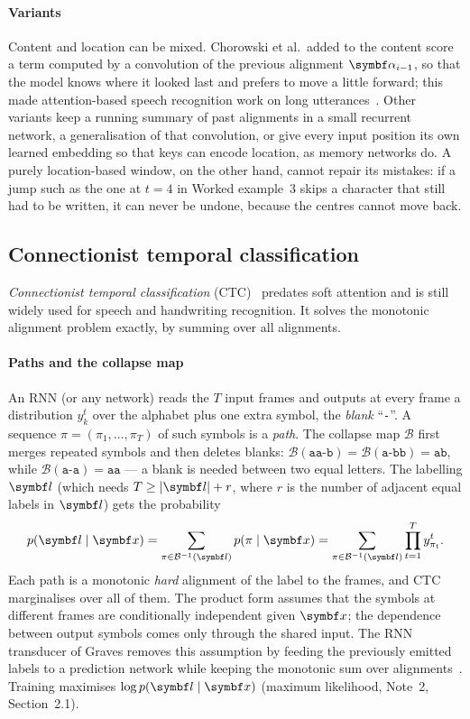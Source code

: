 \documentclass[11pt]{article}
\newcommand{\valpha}{\vect{\alpha}}
\newcommand{\blank}{\texttt{-}}
\begin{document}
\paragraph{Variants} Content and location can be mixed. Chorowski et al.\ added to the content score a term computed by a
convolution of the previous alignment $\valpha_{i-1}$, so that the model knows where it looked last and prefers to move a
little forward; this made attention-based speech recognition work on long utterances~\cite{chorowski2015}. Other
variants keep a running summary of past alignments in a small recurrent network, a generalisation of that convolution, or
give every input position its own learned embedding so that keys can encode location, as memory networks do. A purely
location-based window, on the other hand, cannot repair its mistakes: if a jump such as the one at $t = 4$ in Worked example~3 skips a
character that still had to be written, it can never be undone, because the centres cannot move back.

\subsection{Connectionist temporal classification}\label{sec:ctc}

\emph{Connectionist temporal classification} (CTC)~\cite{graves2006} predates soft attention and is still widely used for
speech and handwriting recognition. It solves the monotonic alignment problem exactly, by summing over all alignments.

\paragraph{Paths and the collapse map} An RNN (or any network) reads the $T$ input frames and outputs at every frame a
distribution $y^t_k$ over the alphabet plus one extra symbol, the \emph{blank} ``\blank''. A sequence $\pi = (\pi_1, \dots,
\pi_T)$ of such symbols is a \emph{path}. The collapse map $\mathcal{B}$ first merges repeated symbols and then deletes
blanks: $\mathcal{B}(\texttt{aa-b}) = \mathcal{B}(\texttt{a-bb}) = \texttt{ab}$, while $\mathcal{B}(\texttt{a-a}) =
\texttt{aa}$ --- a blank is needed between two equal letters. The labelling $\vect{l}$ (which needs $T \ge |\vect{l}| + r$,
where $r$ is the number of adjacent equal labels in $\vect{l}$) gets the probability
\begin{equation}\label{eq:ctc}
  p(\vect{l} \mid \x) = \sum_{\pi \in \mathcal{B}^{-1}(\vect{l})} p(\pi \mid \x)
  = \sum_{\pi \in \mathcal{B}^{-1}(\vect{l})} \prod_{t=1}^{T} y^t_{\pi_t} .
\end{equation}
Each path is a monotonic \emph{hard} alignment of the label to the frames, and CTC marginalises over all of them. The
product form assumes that the symbols at different frames are conditionally independent given $\x$; the dependence between
output symbols comes only through the shared input. The RNN transducer of Graves removes this assumption by feeding the
previously emitted labels to a prediction network while keeping the monotonic sum over alignments~\cite{graves2012}.
Training maximises $\log p(\vect{l} \mid \x)$ (maximum likelihood, Note~2, Section~2.1).
\end{document}
